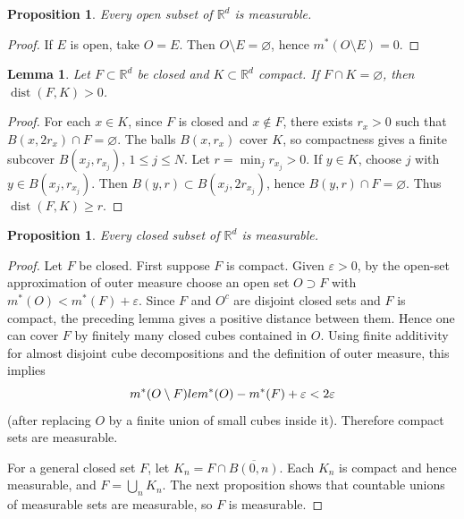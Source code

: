 \documentclass[11pt,openany]{book}
\numberwithin{equation}{chapter}
\theoremstyle{definition}
\theoremstyle{plain}
\newtheorem{proposition}[definition]{Proposition}
\newtheorem{lemma}[definition]{Lemma}
\theoremstyle{remark}
\newcommand{\R}{\mathbb{R}}
\newcommand{\eps}{\varepsilon}
\newcommand{\1}{\mathbf{1}}
\newcommand{\dist}{\operatorname{dist}}
\begin{document}
\begin{proposition}
Every open subset of \(\R^d\) is measurable.
\end{proposition}

\begin{proof}
If \(E\) is open, take \(O=E\).  Then \(O\setminus E=\varnothing\), hence \(m^*(O\setminus E)=0\).
\end{proof}

\begin{lemma}
Let \(F\subset\R^d\) be closed and \(K\subset\R^d\) compact.  If \(F\cap K=\varnothing\), then \(\dist(F,K)>0\).
\end{lemma}

\begin{proof}
For each \(x\in K\), since \(F\) is closed and \(x\notin F\), there exists \(r_x>0\) such that \(B(x,2r_x)\cap F=\varnothing\).  The balls \(B(x,r_x)\) cover \(K\), so compactness gives a finite subcover \(B(x_j,r_{x_j})\), \(1\le j\le N\).  Let \(r=\min_j r_{x_j}>0\).  If \(y\in K\), choose \(j\) with \(y\in B(x_j,r_{x_j})\).  Then \(B(y,r)\subset B(x_j,2r_{x_j})\), hence \(B(y,r)\cap F=\varnothing\).  Thus \(\dist(F,K)\ge r\).
\end{proof}

\begin{proposition}
Every closed subset of \(\R^d\) is measurable.
\end{proposition}

\begin{proof}
Let \(F\) be closed.  First suppose \(F\) is compact.  Given \(\eps>0\), by the open-set approximation of outer measure choose an open set \(O\supset F\) with \(m^*(O)<m^*(F)+\eps\).  Since \(F\) and \(O^c\) are disjoint closed sets and \(F\) is compact, the preceding lemma gives a positive distance between them.  Hence one can cover \(F\) by finitely many closed cubes contained in \(O\).  Using finite additivity for almost disjoint cube decompositions and the definition of outer measure, this implies
\[
    m^*(O\setminus F)\\le m^*(O)-m^*(F)+\eps<2\eps
\]
(after replacing \(O\) by a finite union of small cubes inside it).  Therefore compact sets are measurable.

For a general closed set \(F\), let \(K_n=F\cap \overline{B(0,n)}\).  Each \(K_n\) is compact and hence measurable, and \(F=\bigcup_n K_n\).  The next proposition shows that countable unions of measurable sets are measurable, so \(F\) is measurable.
\end{proof}
\end{document}
